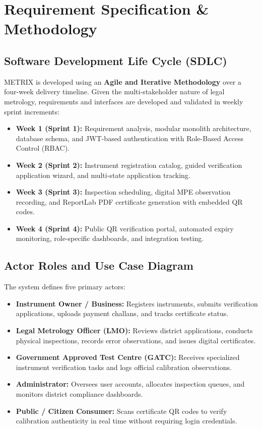 \chapter{Requirement Specification \& Methodology}

\section{Software Development Life Cycle (SDLC)}
METRIX is developed using an \textbf{Agile and Iterative Methodology} over a four-week delivery timeline. Given the multi-stakeholder nature of legal metrology, requirements and interfaces are developed and validated in weekly sprint increments:
\begin{itemize}
    \item \textbf{Week 1 (Sprint 1):} Requirement analysis, modular monolith architecture, database schema, and JWT-based authentication with Role-Based Access Control (RBAC).
    \item \textbf{Week 2 (Sprint 2):} Instrument registration catalog, guided verification application wizard, and multi-state application tracking.
    \item \textbf{Week 3 (Sprint 3):} Inspection scheduling, digital MPE observation recording, and ReportLab PDF certificate generation with embedded QR codes.
    \item \textbf{Week 4 (Sprint 4):} Public QR verification portal, automated expiry monitoring, role-specific dashboards, and integration testing.
\end{itemize}

\section{Actor Roles and Use Case Diagram}
The system defines five primary actors:
\begin{itemize}
    \item \textbf{Instrument Owner / Business:} Registers instruments, submits verification applications, uploads payment challans, and tracks certificate status.
    \item \textbf{Legal Metrology Officer (LMO):} Reviews district applications, conducts physical inspections, records error observations, and issues digital certificates.
    \item \textbf{Government Approved Test Centre (GATC):} Receives specialized instrument verification tasks and logs official calibration observations.
    \item \textbf{Administrator:} Oversees user accounts, allocates inspection queues, and monitors district compliance dashboards.
    \item \textbf{Public / Citizen Consumer:} Scans certificate QR codes to verify calibration authenticity in real time without requiring login credentials.
\end{itemize}

